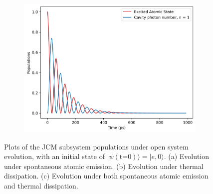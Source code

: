 \documentclass[11pt]{article}
\begin{document}
\begin{figure}[H]
    \vspace{0.5cm}
    
    \begin{subfigure}{0.45\textwidth} 
        \centering
        \includegraphics[width=\linewidth]{Research Project/Code/results/JCM/OQS_Pop_Both.png}
        \caption{}
         \label{fig:JCM_OQS_Pop_Both}
    \end{subfigure}
    \hfill
    \caption{Plots of the JCM subsystem populations under open system evolution, with an initial state of $|\psi (\text{t=0})\rangle = |e, 0\rangle$. (a) Evolution under spontaneous atomic emission. (b) Evolution under thermal dissipation. (c) Evolution under both spontaneous atomic emission and thermal dissipation.}
    \label{fig:JCM_OQS_Pop}
\end{figure}
\end{document}
